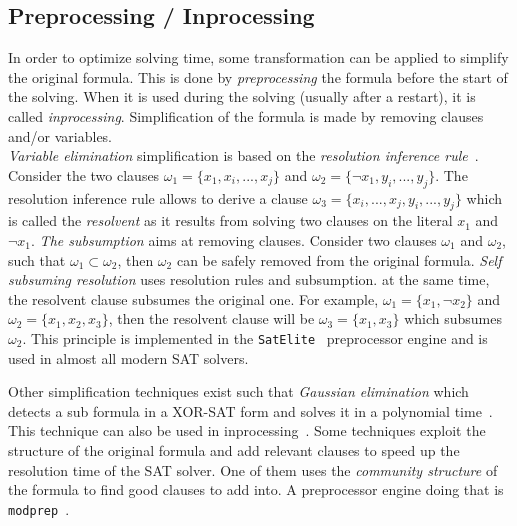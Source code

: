 \subsection{Preprocessing / Inprocessing}
In order to optimize solving time, some transformation can be applied to simplify the original formula.
This is done by \emph{preprocessing} the formula before the start of the solving.
When it is used during the solving (usually after a restart), it is called \emph{inprocessing}.
Simplification of the formula is made by removing clauses and/or variables.\\
\emph{Variable elimination} simplification is based on the \emph{resolution inference rule}~\cite{robinson1965machine}.
Consider the two clauses $\omega_1 = \{x_1, x_i, ..., x_j \}$ and $\omega_2 = \{\neg x_1, y_i, ..., y_j\}$.
The resolution inference rule allows to derive a clause $\omega_3 = \{x_i, ..., x_j, y_i, ..., y_j\}$ which is called
the \emph{resolvent} as it results from solving two clauses on the literal $x_1$ and $\neg x_1$.
\emph{The subsumption} aims at removing  clauses. Consider two clauses $\omega_1$ and $\omega_2$, such that
$\omega_1 \subset  \omega_2$, then $\omega_2$ can be safely removed from the original formula.
\emph{Self subsuming resolution} uses resolution rules and subsumption. at the same time,
the resolvent clause subsumes the original one. For example, $\omega_1 = \{x_1, \neg x_2\}$ and $\omega_2 = \{x_1, x_2, x_3\}$,
 then the resolvent clause will be $\omega_3 = \{x_1, x_3\}$ which subsumes $\omega_2$. This principle
is implemented in the \texttt{SatElite}~\cite{een2005effective} preprocessor engine and is used in almost all modern SAT solvers.

Other simplification techniques exist such that \emph{Gaussian elimination} which detects a sub formula in a XOR-SAT
form and solves it in a polynomial time~\cite{moore2011nature}. This technique can also be used in inprocessing~\cite{soos2010enhanced}. 
Some techniques exploit the structure of the original formula and add relevant clauses to speed up the resolution
time of the SAT solver. One of them uses the \textit{community structure} of the formula to find good clauses to add into.
A preprocessor engine doing that is \texttt{modprep}~\cite{ansotegui2015using}.
